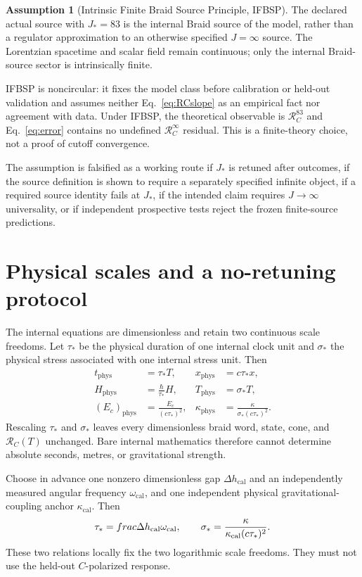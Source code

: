 \documentclass[11pt]{article}
\theoremstyle{definition}
\newtheorem{assumption}[theorem]{Assumption}
\theoremstyle{remark}
\newcommand{\RC}{\mathcal{R}_{C}}
\begin{document}
\begin{assumption}[Intrinsic Finite Braid Source Principle, IFBSP]\label{ass:ifbsp}
The declared actual source with $J_*=83$ is the internal Braid source of the model, rather than a regulator approximation to an otherwise specified $J=\infty$ source. The Lorentzian spacetime and scalar field remain continuous; only the internal Braid-source sector is intrinsically finite.
\end{assumption}

IFBSP is noncircular: it fixes the model class before calibration or held-out validation and assumes neither Eq.~\eqref{eq:RCslope} as an empirical fact nor agreement with data. Under IFBSP, the theoretical observable is $\RC^{83}$ and Eq.~\eqref{eq:error} contains no undefined $\RC^\infty$ residual. This is a finite-theory choice, not a proof of cutoff convergence.

The assumption is falsified as a working route if $J_*$ is retuned after outcomes, if the source definition is shown to require a separately specified infinite object, if a required source identity fails at $J_*$, if the intended claim requires $J\to\infty$ universality, or if independent prospective tests reject the frozen finite-source predictions.

\section{Physical scales and a no-retuning protocol}

The internal equations are dimensionless and retain two continuous scale freedoms. Let $\tau_*$ be the physical duration of one internal clock unit and $\sigma_*$ the physical stress associated with one internal stress unit. Then
\begin{align}
 t_{\mathrm{phys}}&=\tau_*T,&
 x_{\mathrm{phys}}&=c\tau_*x,\\
 H_{\mathrm{phys}}&=\frac{\hbar}{\tau_*}H,&
 T_{\mathrm{phys}}&=\sigma_*T,\\
 (E_c)_{\mathrm{phys}}&=\frac{E_c}{(c\tau_*)^2},&
 \kappa_{\mathrm{phys}}&=\frac{\kappa}{\sigma_*(c\tau_*)^2}.
\end{align}
Rescaling $\tau_*$ and $\sigma_*$ leaves every dimensionless braid word, state, cone, and $\RC(T)$ unchanged. Bare internal mathematics therefore cannot determine absolute seconds, metres, or gravitational strength.

Choose in advance one nonzero dimensionless gap $\Delta h_{\mathrm{cal}}$ and an independently measured angular frequency $\omega_{\mathrm{cal}}$, and one independent physical gravitational-coupling anchor $\kappa_{\mathrm{cal}}$. Then
\begin{equation}
 \tau_*=\\frac{\Delta h_{\mathrm{cal}}}{\omega_{\mathrm{cal}}},
 \qquad
 \sigma_*=\frac{\kappa}{\kappa_{\mathrm{cal}}(c\tau_*)^2}.
\end{equation}
These two relations locally fix the two logarithmic scale freedoms. They must not use the held-out $C$-polarized response.
\end{document}
